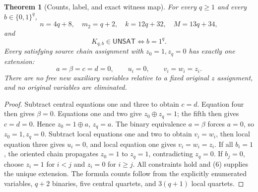 \documentclass[11pt]{article}
\newtheorem{theorem}{Theorem}
\newcommand{\UNSAT}{\mathsf{UNSAT}}
\begin{document}
\begin{theorem}[Counts, label, and exact witness map]
For every $q\ge1$ and every $b\in\{0,1\}^q$,
\[
\boxed{n=4q+8,\quad m_2=q+2,\quad k=12q+32,\quad M=13q+34,}
\tag{4}
\]
and
\[
\boxed{K_{q,b}\in\UNSAT\iff b=1^q.} \tag{5}
\]
Every satisfying source chain assignment with $z_0=1,z_q=0$ has
exactly one extension:
\[
 a=\beta=c=d=0,\qquad u_i=0,\qquad v_i=w_i=z_i. \tag{6}
\]
There are no free new auxiliary variables relative to a fixed original
$z$ assignment, and no original variables are eliminated.
\end{theorem}
\begin{proof}
Subtract central equations one and three to obtain $c=d$.
Equation four then gives $\beta=0$.
Equations one and two give $z_0\oplus z_q=1$; the fifth then gives
$c=d=0$. Hence $z_0=1\oplus a$, $z_q=a$.
The binary equivalence $a=\beta$ forces $a=0$, so
$z_0=1,z_q=0$.
Subtract local equations one and two to obtain $v_i=w_i$,
then local equation three gives $u_i=0$, and local equation one
gives $v_i=w_i=z_i$. If all $b_i=1$, the oriented chain propagates
$z_0=1$ to $z_q=1$, contradicting $z_q=0$.
If $b_j=0$, choose $z_i=1$ for $i<j$ and $z_i=0$ for $i\ge j$.
All constraints hold and (6) supplies the unique extension.
The formula counts follow from the explicitly enumerated variables,
$q+2$ binaries, five central quartets, and $3(q+1)$ local quartets.
\end{proof}
\end{document}

